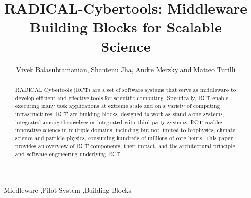 \documentclass[preprint,12pt, a4paper]{elsarticle}
\begin{document}
\begin{frontmatter}


\title{RADICAL-Cybertools: Middleware Building Blocks for Scalable Science}

\author{Vivek Balasubramanian, Shantenu Jha, Andre Merzky and Matteo Turilli}
\address{Electrical \& Computer Engineering, Rutgers University, Piscataway,NJ 08854, USA}







\begin{abstract}

RADICAL-Cybertools (RCT) are a set of software systems that serve as
middleware to develop efficient and effective tools for scientific computing.
Specifically, RCT enable executing many-task applications at extreme scale
and on a variety of computing infrastructures. RCT are building blocks,
designed to work as stand-alone systems, integrated among themselves or
integrated with third-party systems. RCT enables innovative science in
multiple domains, including but not limited to biophysics, climate science
and particle physics, consuming hundreds of millions of core hours. This
paper provides an overview of RCT components, their impact, and the
architectural principle and software engineering underlying RCT\@.
\end{abstract}

\begin{keyword}

Middleware \sep Pilot System \sep Building Blocks



\end{keyword}

\end{frontmatter}
\end{document}
